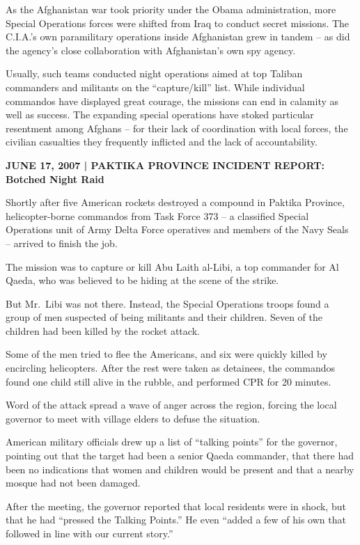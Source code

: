 ﻿\documentclass[12pt]{article}
\begin{document}
As the Afghanistan war took priority under the Obama administration, more Special Operations forces
were shifted from Iraq to conduct secret missions. The C.I.A.'s own paramilitary operations inside
Afghanistan grew in tandem -- as did the agency's close collaboration with Afghanistan's own spy
agency.

Usually, such teams conducted night operations aimed at top Taliban commanders and militants on the
``capture/kill'' list. While individual commandos have displayed great courage, the missions can end
in calamity as well as success. The expanding special operations have stoked particular resentment
among Afghans -- for their lack of coordination with local forces, the civilian casualties they
frequently inflicted and the lack of accountability.

\textbf{JUNE 17, 2007 | PAKTIKA PROVINCE INCIDENT REPORT: Botched Night Raid}

Shortly after five American rockets destroyed a compound in Paktika Province, helicopter-borne
commandos from Task Force 373 -- a classified Special Operations unit of Army Delta Force operatives
and members of the Navy Seals -- arrived to finish the job.

The mission was to capture or kill Abu Laith al-Libi, a top commander for Al Qaeda, who was believed
to be hiding at the scene of the strike.

But Mr.~Libi was not there. Instead, the Special Operations troops found a group of men suspected of
being militants and their children. Seven of the children had been killed by the rocket attack.

Some of the men tried to flee the Americans, and six were quickly killed by encircling helicopters.
After the rest were taken as detainees, the commandos found one child still alive in the rubble, and
performed CPR for 20 minutes.

Word of the attack spread a wave of anger across the region, forcing the local governor to meet with
village elders to defuse the situation.

American military officials drew up a list of ``talking points'' for the governor, pointing out that
the target had been a senior Qaeda commander, that there had been no indications that women and
children would be present and that a nearby mosque had not been damaged.

After the meeting, the governor reported that local residents were in shock, but that he had
``pressed the Talking Points.'' He even ``added a few of his own that followed in line with our
current story.''
\end{document}
